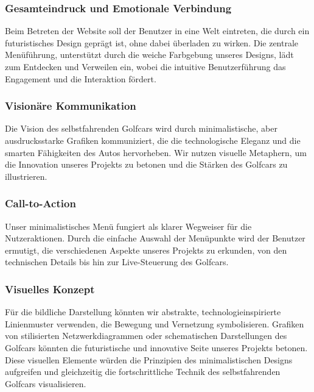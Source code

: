 \subsubsection{Gesamteindruck und Emotionale Verbindung}
Beim Betreten der Website soll der Benutzer in eine Welt eintreten, die durch ein futuristisches Design geprägt ist, ohne dabei überladen zu wirken. Die zentrale Menüführung, unterstützt durch die weiche Farbgebung unseres Designs, lädt zum Entdecken und Verweilen ein, wobei die intuitive Benutzerführung das Engagement und die Interaktion fördert.

\subsubsection{Visionäre Kommunikation}
Die Vision des selbstfahrenden Golfcars wird durch minimalistische, aber ausdrucksstarke Grafiken kommuniziert, die die technologische Eleganz und die smarten Fähigkeiten des Autos hervorheben. Wir nutzen visuelle Metaphern, um die Innovation unseres Projekts zu betonen und die Stärken des Golfcars zu illustrieren.

\subsubsection{Call-to-Action}
Unser minimalistisches Menü fungiert als klarer Wegweiser für die Nutzeraktionen. Durch die einfache Auswahl der Menüpunkte wird der Benutzer ermutigt, die verschiedenen Aspekte unseres Projekts zu erkunden, von den technischen Details bis hin zur Live-Steuerung des Golfcars.

\subsubsection{Visuelles Konzept}
Für die bildliche Darstellung könnten wir abstrakte, technologieinspirierte Linienmuster verwenden, die Bewegung und Vernetzung symbolisieren. Grafiken von stilisierten Netzwerkdiagrammen oder schematischen Darstellungen des Golfcars könnten die futuristische und innovative Seite unseres Projekts betonen. Diese visuellen Elemente würden die Prinzipien des minimalistischen Designs aufgreifen und gleichzeitig die fortschrittliche Technik des selbstfahrenden Golfcars visualisieren.



